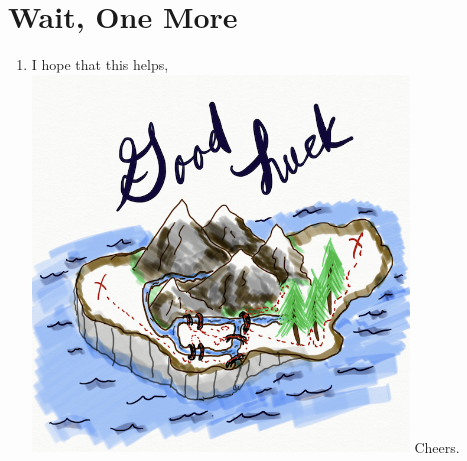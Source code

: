 \documentclass{article}
\begin{document}
\section*{Wait, One More}
\begin{enumerate}[label=(\alph*)]
\item{
    I hope that this helps, \newline
    \includegraphics[width=10cm, height=10cm]{graphic.png}
    Cheers.
}
\end{enumerate}
\end{document}
